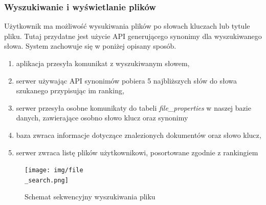 \documentclass[12pt,a4paper,twoside]{article}
\begin{document}
\subsubsection{Wyszukiwanie i wyświetlanie plików}
Użytkownik ma możliwość wysukiwania plików po słowach kluczach lub tytule pliku. Tutaj przydatne jest użycie API generującego synonimy dla wyszukiwanego słowa. System zachowuje się w poniżej opisany sposób.
\begin{enumerate}
	\item aplikacja przesyła komunikat z wyszukiwanym słowem,
	\item serwer używając API synonimów pobiera 5 najbliższych słów do słowa szukanego przypisując im ranking,
	\item serwer przesyła osobne komunikaty do tabeli \textit{file\_properties} w naszej bazie danych, zawierające osobno słowo klucz oraz synonimy
	\item baza zwraca informacje dotyczące znalezionych dokumentów oraz słowo klucz,
	\item serwer zwraca listę plików użytkownikowi, posortowane zgodnie z rankingiem
\end{enumerate}
\begin{figure}[h!]
\centering
  \texttt{[image: img/file\\\_search.png]}
  \caption{Schemat sekwencyjny wyszukiwania pliku}
\end{figure}
\newpage
\end{document}
